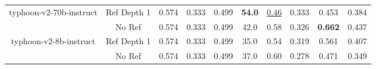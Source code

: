 \begin{table}[ht]
{\begin{tabular}{@{}c|ccccccccc@{}}
\multirow{2}{*}{typhoon-v2-70b-instruct}    & Ref Depth 1 & 0.574         & 0.333               & 0.499            & \textbf{54.0} & \underline{0.46}    & 0.333          & 0.453          & 0.384          \\
                                            & No Ref      & 0.574         & 0.333               & 0.499            & 42.0          & 0.58          & 0.326          & \textbf{0.662} & 0.437          \\ \midrule
\multirow{2}{*}{typhoon-v2-8b-instruct}     & Ref Depth 1 & 0.574         & 0.333               & 0.499            & 35.0          & 0.54          & 0.319          & 0.561          & 0.407          \\
                                            & No Ref      & 0.574         & 0.333               & 0.499            & 37.0          & 0.60          & 0.278          & 0.471          & 0.349          \\ \bottomrule
\end{tabular}
}
\end{table}

